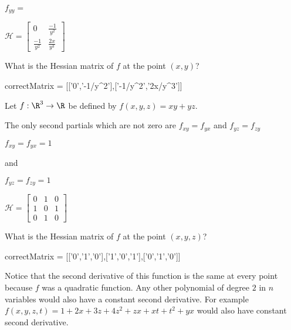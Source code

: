 \documentclass{ximera}
\begin{document}
\begin{question}
\begin{solution}
\begin{hint}
\begin{question}
\begin{solution}
\begin{hint}
\begin{align*}
 							\end{align*}
 						\end{hint}
 							$f_{yy}=$
 						\end{solution}
 					\end{question}
 				\end{hint}
 		\begin{hint}
 					\(\mathcal{H} = \begin{bmatrix} 0 & \frac{-1}{y^2}\\ \frac{-1}{y^2} &  \frac{2x}{y^3} \end{bmatrix} \)
 				\end{hint}
 		What is the Hessian matrix of $f$ at the point $(x,y)$?
 			\begin{matrix-answer}
 				correctMatrix = [['0','-1/y^2'],['-1/y^2','2x/y^3']]
 			\end{matrix-answer}
 	\end{solution}
 \end{question}
 
 \begin{question}
 	Let $f:\R^3 \to \R$ be defined by $f(x,y,z) = xy+yz$.
 	\begin{solution}
 		\begin{hint}
 			The only second partials which are not zero are $f_{xy} = f_{yx}$ and $f_{yz} =f_{zy}$
 		\end{hint}
 		\begin{hint}
 			$f_{xy} = f_{yx} = 1$
 			
 			and
 		
 			$f_{yz} = f_{zy} = 1$
 		\end{hint}
 		\begin{hint}	
 			\(\mathcal{H} = \begin{bmatrix} 0 & 1&0\\1&0&1\\0&1&0\end{bmatrix}\)
 		\end{hint}
 		What is the Hessian matrix of $f$ at the point $(x,y,z)$?
 			\begin{matrix-answer}
 				correctMatrix = [['0','1','0'],['1','0','1'],['0','1','0']]
 			\end{matrix-answer}
 	\end{solution}
 		Notice that the second derivative of this function is the same at every point because $f$ was a quadratic function.  Any other polynomial of
 		degree $2$ in $n$ variables would also have a constant second derivative. For example $f(x,y,z,t) = 1+2x+3z+4z^2+zx+xt+t^2+yx$ would also have
 		constant second derivative.
 \end{question}
 
%
\end{document}
